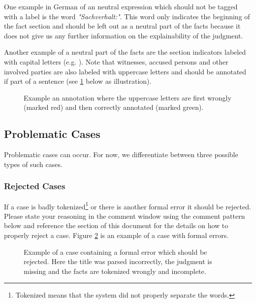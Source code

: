 \documentclass{article}
\begin{document}
One example in German of an neutral expression which should not be tagged with a label is the word \emph{"Sachverhalt:"}. This word only indicates the beginning of the fact section and should be left out as a neutral part of the facts because it does not give us any further information on the explainability of the judgment. 

Another example of a neutral part of the facts are the section indicators labeled with capital letters (e.g. ). Note that witnesses, accused persons and other involved parties are also labeled with uppercase letters and should be annotated if part of a sentence (see \ref{uppercase} below as illustration).
\begin{figure}[H]
     \caption{Example an annotation where the uppercase letters are first wrongly (marked red)  and then correctly annotated (marked green). }
     \label{uppercase}
\end{figure}



\subsection{Problematic Cases}
Problematic cases can occur. For now, we differentiate between three possible types of such cases.

\subsubsection{Rejected Cases}
If a case is badly tokenized\footnote{Tokenized means that the system did not properly separate the words.} or there is another formal error it should be rejected. Please state your reasoning in the comment window using the comment pattern below and reference the  section of this document for the details on how to properly reject a case. Figure \ref{reject_case} is an example of a case with formal errors. 
\begin{figure}[H]
     \caption{Example of a case containing a formal error which should be rejected. Here the title was parsed incorrectly, the judgment is missing and the facts are tokenized wrongly and incomplete.}
     \label{reject_case}
\end{figure}
\end{document}
